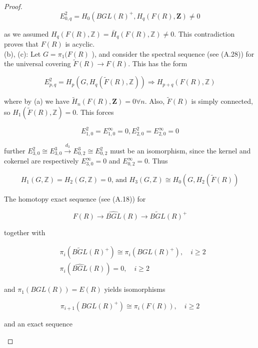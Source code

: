 \begin{proof}
    $$
    E_{0, q}^2=H_0\left(B G L(R)^{+}, H_q(F(R), \mathbf{Z}) \neq 0\right.
    $$
    
    as we assumed $H_q(F(R), \mathbb{Z})=\bar{H}_q(F(R), \mathbb{Z}) \neq 0$. This contradiction proves that $F(R)$ is acyclic.  \\

    (b), (c): Let $G=\pi_1(F(R)$ ), and consider the spectral sequence (see (A.28)) for the universal covering $\tilde{F}(R) \longrightarrow F(R)$. This has the form

    $$
    E_{p, q}^2=H_p\left(G, H_q(\tilde{F}(R), \mathbb{Z})\right) \Longrightarrow H_{p+q}(F(R), \mathbb{Z})
    $$
    
    where by (a) we have $\tilde{H}_n(F(R), \mathbf{Z})=0 \forall n$. Also, $\tilde{F}(R)$ is simply connected, so $H_1(\tilde{F}(R), \mathbb{Z})=0$. This forces
    
    $$
    E_{1,0}^2=E_{1,0}^{\infty}=0, E_{2,0}^2=E_{2,0}^{\infty}=0
    $$
    
    further $E_{3,0}^2 \cong E_{3,0}^3 \xrightarrow{d_3} E_{0,2}^3 \cong E_{0,2}^2$ must be an isomorphism, since the kernel and cokernel are respectively $E_{3,0}^{\infty}=0$ and $E_{0,2}^{\infty}=0$. Thus
    
    $$
    H_1(G, \mathbb{Z})=H_2(G, \mathbb{Z})=0 \text {, and } H_3(G, \mathbb{Z}) \cong H_0\left(G, H_2(\tilde{F}(R))\right.
    $$
    
    
    The homotopy exact sequence (see (A.18)) for
    
    $$
    F(R) \longrightarrow \widehat{B G L}(R) \longrightarrow \widetilde{B G L}(R)^{+}
    $$
    
    together with
    
    $$
    \begin{aligned}
    & \pi_i\left(\widetilde{B G L}(R)^{+}\right) \cong \pi_i\left(B G L(R)^{+}\right), \quad i \geq 2 \\
    & \pi_i(\widehat{B G L}(R))=0, \quad i \geq 2
    \end{aligned}
    $$
    
    and $\pi_1(B G L(R))=E(R)$ yields isomorphisms
    
    $$
    \pi_{i+1}\left(B G L(R)^{+}\right) \cong \pi_i(F(R)), \quad i \geq 2
    $$
    
    and an exact sequence
    \begin{center}
    \end{center}



\end{proof}
